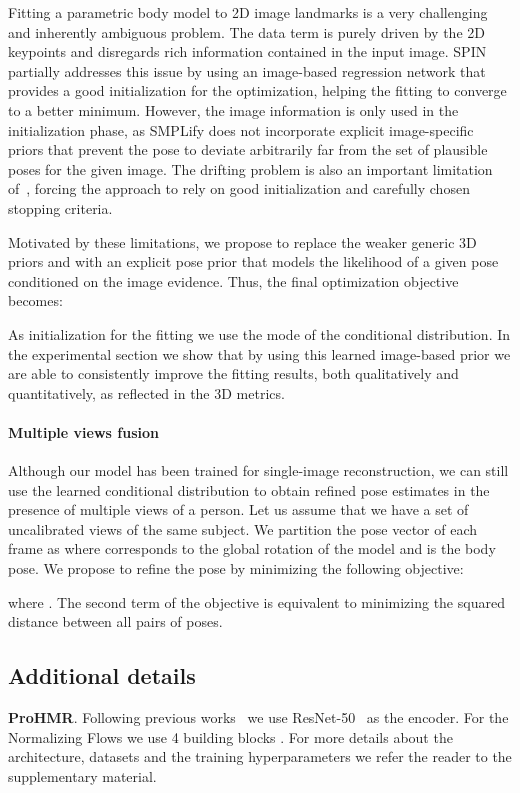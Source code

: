 Fitting a parametric body model to 2D image landmarks is a very challenging and inherently ambiguous problem. The data term  is purely driven by the 2D keypoints and disregards rich information contained in the input image. SPIN~\cite{kolotouros2019spin} partially addresses this issue by using an image-based regression network that provides a good initialization for the optimization, helping the fitting to converge to a better minimum. However, the image information is only used in the initialization phase, as SMPLify does not incorporate explicit image-specific priors that prevent the pose to deviate arbitrarily far from the set of plausible poses for the given image. The drifting problem is also an important limitation of~\cite{joo2020eft}, forcing the approach to rely on good initialization and carefully chosen stopping criteria.

Motivated by these limitations, we propose to replace the weaker generic 3D priors  and  with an explicit pose prior  that models the likelihood of a given pose conditioned on the image evidence. Thus, the final optimization objective becomes:

As initialization for the fitting we use the mode  of the conditional distribution. In the experimental section we show that by using this learned image-based prior we are able to consistently improve the fitting results, both qualitatively and quantitatively, as reflected in the 3D metrics.

\paragraph{Multiple views fusion}
Although our model has been trained for single-image reconstruction, we can still use the learned conditional distribution to obtain refined pose estimates in the presence of multiple views of a person. Let us assume that we have a set  of uncalibrated views of the same subject. We partition the pose vector of each frame as  where  corresponds to the global rotation of the model and  is the body pose. We propose to refine the pose by minimizing the following objective:

where . The second term of the objective is equivalent to minimizing the squared distance between all pairs of poses.

\subsection{Additional details}
\noindent
\textbf{ProHMR}.
Following previous works~\cite{kanazawa2018end, kolotouros2019spin} we use ResNet-50~\cite{he2016deep} as the encoder. For the Normalizing Flows we use 4 building blocks . For more details about the architecture, datasets and the training hyperparameters we refer the reader to the supplementary material.

